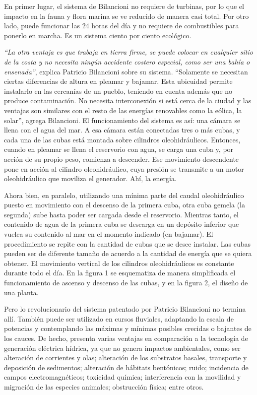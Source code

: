 \documentclass[12pt,letterpaper,superscriptaddress]{article}
\begin{document}
En primer lugar, el sistema de Bilancioni no requiere de turbinas, por lo que el impacto en la fauna y flora marina se ve reducido de manera casi total. Por otro lado, puede funcionar las 24 horas del día y no requiere de combustibles para ponerlo en marcha. Es un sistema ciento por ciento ecológico.

\emph{“La otra ventaja es que trabaja en tierra firme, se puede colocar en cualquier sitio de la costa y no necesita ningún accidente costero especial, como ser una bahía o ensenada”}, explica Patricio Bilancioni sobre su sistema. “Solamente se necesitan ciertas diferencias de altura en pleamar y bajamar. Esta ubicuidad permite instalarlo en las cercanías de un pueblo, teniendo en cuenta además que no produce contaminación. No necesita interconexión si está cerca de la ciudad y las ventajas son similares con el resto de las energías renovables como la eólica, la solar”, agrega Bilancioni.
El funcionamiento del sistema es así: una cámara se llena con el agua del mar. A esa cámara están conectadas tres o más cubas, y cada una de las cubas está montada sobre cilindros oleohidráulicos. Entonces, cuando en pleamar se llena el reservorio con agua, se carga una cuba y, por acción de su propio peso, comienza a descender. Ese movimiento descendente pone en acción al cilindro oleohidráulico, cuya presión se transmite a un motor oleohidráulico que moviliza el generador. Ahí, la energía.

Ahora bien, en paralelo, utilizando una mínima parte del caudal oleohidráulico puesto en movimiento con el descenso de la primera cuba, otra cuba gemela (la segunda) sube hasta poder ser cargada desde el reservorio. Mientras tanto, el contenido de agua de la primera cuba se descarga en un depósito inferior que vuelca su contenido al mar en el momento indicado (en bajamar). El procedimiento se repite con la cantidad de cubas que se desee instalar. Las cubas pueden ser de diferente tamaño de acuerdo a la cantidad de energía que se quiera obtener. El movimiento vertical de los cilindros oleohidráulicos es constante durante todo el día. En la figura 1 se esquematiza de manera simplificada el funcionamiento de ascenso y descenso de las cubas, y en la figura 2, el diseño de una planta.

Pero lo revolucionario del sistema patentado por Patricio Bilancioni no termina allí. También puede ser utilizado en cursos fluviales, adaptando la escala de potencias y contemplando las máximas y mínimas posibles crecidas o bajantes de los cauces. De hecho, presenta varias ventajas en comparación a la tecnología de generación eléctrica hídrica, ya que no genera impactos ambientales, como ser alteración de corrientes y olas; alteración de los substratos basales, transporte y deposición de sedimentos; alteración de hábitats bentónicos; ruido; incidencia de campos electromagnéticos; toxicidad química; interferencia con la movilidad y migración de las especies animales; obstrucción física; entre otros.
\end{document}
